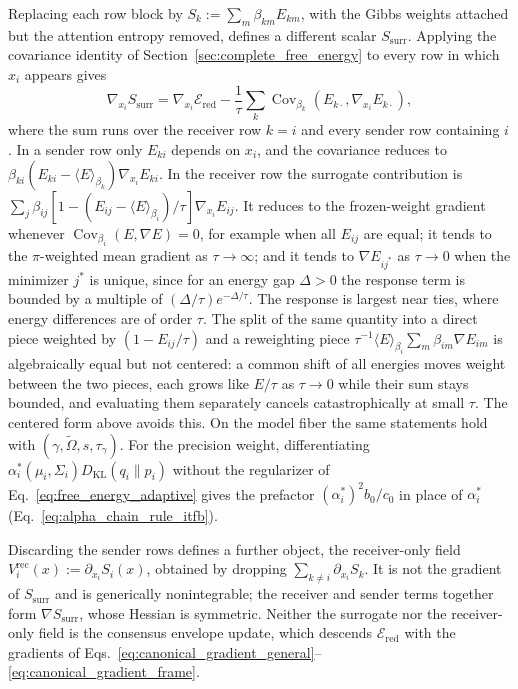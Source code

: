 Replacing each row block by $S_k := \sum_m \beta_{km}E_{km}$, with the Gibbs weights attached but the attention entropy removed, defines a different scalar $S_{\mathrm{surr}}$. Applying the covariance identity of Section~\ref{sec:complete_free_energy} to every row in which $x_i$ appears gives
\begin{equation}
\nabla_{x_i}S_{\mathrm{surr}} = \nabla_{x_i}\mathcal{E}_{\mathrm{red}} - \frac{1}{\tau}\sum_{k}\operatorname{Cov}_{\beta_k}\left(E_{k\cdot}, \nabla_{x_i}E_{k\cdot}\right),
\label{eq:surrogate_covariance_gap}
\end{equation}
where the sum runs over the receiver row $k = i$ and every sender row containing $i$. In a sender row only $E_{ki}$ depends on $x_i$, and the covariance reduces to $\beta_{ki}(E_{ki} - \langle E\rangle_{\beta_k})\nabla_{x_i}E_{ki}$. In the receiver row the surrogate contribution is $\sum_j \beta_{ij}[1 - (E_{ij} - \langle E\rangle_{\beta_i})/\tau]\nabla_{x_i}E_{ij}$. It reduces to the frozen-weight gradient whenever $\operatorname{Cov}_{\beta_i}(E, \nabla E) = 0$, for example when all $E_{ij}$ are equal; it tends to the $\pi$-weighted mean gradient as $\tau \to \infty$; and it tends to $\nabla E_{ij^*}$ as $\tau \to 0$ when the minimizer $j^*$ is unique, since for an energy gap $\Delta > 0$ the response term is bounded by a multiple of $(\Delta/\tau)e^{-\Delta/\tau}$. The response is largest near ties, where energy differences are of order $\tau$. The split of the same quantity into a direct piece weighted by $(1 - E_{ij}/\tau)$ and a reweighting piece $\tau^{-1}\langle E\rangle_{\beta_i}\sum_m\beta_{im}\nabla E_{im}$ is algebraically equal but not centered: a common shift of all energies moves weight between the two pieces, each grows like $E/\tau$ as $\tau \to 0$ while their sum stays bounded, and evaluating them separately cancels catastrophically at small $\tau$. The centered form above avoids this. On the model fiber the same statements hold with $(\gamma, \tilde\Omega, s, \tau_\gamma)$. For the precision weight, differentiating $\alpha_i^*(\mu_i,\Sigma_i)D_{\mathrm{KL}}(q_i\|p_i)$ without the regularizer of Eq.~\eqref{eq:free_energy_adaptive} gives the prefactor $(\alpha_i^*)^2 b_0/c_0$ in place of $\alpha_i^*$ (Eq.~\eqref{eq:alpha_chain_rule_itfb}).

Discarding the sender rows defines a further object, the receiver-only field $V_i^{\mathrm{rec}}(x) := \partial_{x_i}S_{i}(x)$, obtained by dropping $\sum_{k \ne i}\partial_{x_i}S_{k}$. It is not the gradient of $S_{\mathrm{surr}}$ and is generically nonintegrable; the receiver and sender terms together form $\nabla S_{\mathrm{surr}}$, whose Hessian is symmetric. Neither the surrogate nor the receiver-only field is the consensus envelope update, which descends $\mathcal{E}_{\mathrm{red}}$ with the gradients of Eqs.~\eqref{eq:canonical_gradient_general}--\eqref{eq:canonical_gradient_frame}.

